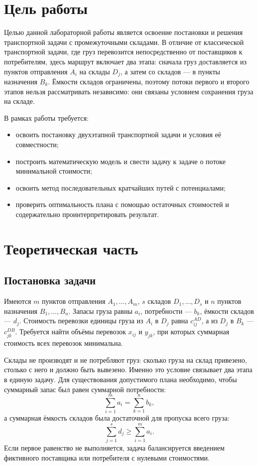 

\section{Цель работы}

Целью данной лабораторной работы является освоение постановки и решения
транспортной задачи с промежуточными складами. В отличие от классической
транспортной задачи, где груз перевозится непосредственно от поставщиков к
потребителям, здесь маршрут включает два этапа: сначала груз доставляется
из пунктов отправления $A_i$ на склады $D_j$, а затем со складов --- в
пункты назначения $B_k$. Ёмкости складов ограничены, поэтому потоки первого
и второго этапов нельзя рассматривать независимо: они связаны условием
сохранения груза на складе.

В рамках работы требуется:
\begin{itemize}
    \item освоить постановку двухэтапной транспортной задачи и условия её
          совместности;
    \item построить математическую модель и свести задачу к задаче о потоке
          минимальной стоимости;
    \item освоить метод последовательных кратчайших путей с потенциалами;
    \item проверить оптимальность плана с помощью остаточных стоимостей и
          содержательно проинтерпретировать результат.
\end{itemize}

\clearpage

\section{Теоретическая часть}

\subsection*{Постановка задачи}

Имеются $m$ пунктов отправления $A_1,\ldots,A_m$, $s$ складов
$D_1,\ldots,D_s$ и $n$ пунктов назначения $B_1,\ldots,B_n$. Запасы груза
равны $a_i$, потребности --- $b_k$, ёмкости складов --- $d_j$. Стоимость
перевозки единицы груза из $A_i$ в $D_j$ равна $c^{AD}_{ij}$, а из $D_j$ в
$B_k$ --- $c^{DB}_{jk}$. Требуется найти объёмы перевозок $x_{ij}$ и
$y_{jk}$, при которых суммарная стоимость всех перевозок минимальна.

Склады не производят и не потребляют груз: сколько груза на склад
привезено, столько с него и должно быть вывезено. Именно это условие
связывает два этапа в единую задачу. Для существования допустимого плана
необходимо, чтобы суммарный запас был равен суммарной потребности:
\[
\sum_{i=1}^{m} a_i=\sum_{k=1}^{n} b_k,
\]
а суммарная ёмкость складов была достаточной для пропуска всего груза:
\[
\sum_{j=1}^{s} d_j\ge \sum_{i=1}^{m} a_i.
\]
Если первое равенство не выполняется, задача балансируется введением
фиктивного поставщика или потребителя с нулевыми стоимостями.

